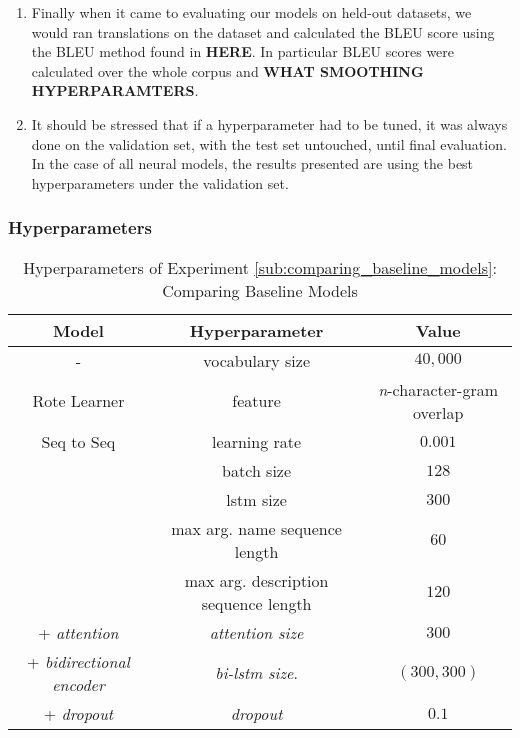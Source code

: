 \begin{enumerate}
    \item Finally when it came to evaluating our models on held-out datasets, we would ran translations on the dataset and calculated the BLEU score using the BLEU method found in \textbf{HERE}.
    In particular BLEU scores were calculated over the whole corpus and \textbf{WHAT SMOOTHING HYPERPARAMTERS}.
    \item It should be stressed that if a hyperparameter had to be tuned, it was always done on the validation set, with the test set untouched, until final evaluation. In the case of all neural models, the results presented are using the best hyperparameters under the validation set.

\end{enumerate}

\subsubsection{Hyperparameters}

\begin{table}[h!]
\begin{center}
\begin{tabular}{ c | c | c  }
    Model                           {}  & Hyperparameter  & Value    \\
    \hline
    -                                 & vocabulary size            & $40,000$ \\
    \hline
    Rote Learner                      & feature                    & \textit{n}-character-gram overlap \\
    \hline
    Seq to Seq                        & learning rate              & $0.001$         \\
                                      & batch size                 & $128$           \\
                                      & lstm size                  & $300$           \\
                                      & max arg. name sequence length         & $60$   \\
                                      & max arg. description sequence length  & $120$  \\
    + \textit{attention}              & \textit{attention size}    & $300$           \\
    + \textit{bidirectional encoder}  & \textit{bi-lstm size}.     & $(300,300) $    \\
    + \textit{dropout}                & \textit{dropout}           & $0.1$           \\
    \hline
\end{tabular}
\caption {Hyperparameters of Experiment \ref{sub:comparing_baseline_models}: Comparing Baseline Models }
\label{table:hyperparams_name_baseline}
\end{center}
\end{table}


